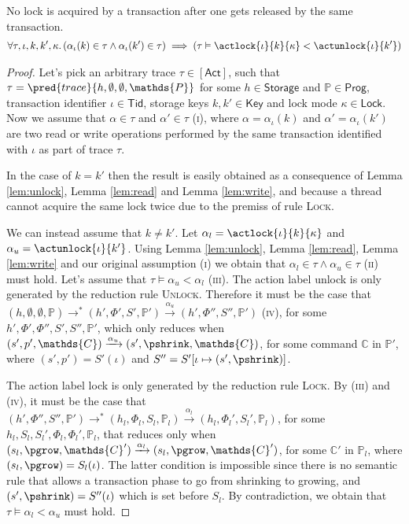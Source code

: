 \lem \label{lem:2phase} No lock is acquired by a transaction after one gets released by the same transaction.
\begin{gather*}
\forall \tau, \iota, k, k', \kappa \ldotp 
\left( \alpha_\iota(k) \in \tau \land \alpha_\iota(k') \in \tau \right)
\implies \left( \tau \vDash \actlock{\iota}{k}{\kappa} < \actunlock{\iota}{k'} \right)
\end{gather*}

\begin{proof}
Let's pick an arbitrary trace $\tau \in \mathsf{[Act]}$, such that $\tau = \pred{trace}{h, \emptyset, \emptyset, \mathds{P}}$ for some $h \in \mathsf{Storage}$ and $\mathds{P} \in \mathsf{Prog}$, transaction identifier $\iota \in \mathsf{Tid}$, storage keys $k, k' \in \mathsf{Key}$ and lock mode $\kappa \in \mathsf{Lock}$. Now we assume that  $\alpha \in \tau$ and $\alpha' \in \tau$ (\textsc{i}), where $\alpha = \alpha_\iota(k)$ and $\alpha' = \alpha_\iota(k')$ are two read or write operations performed by the same transaction identified with $\iota$ as part of trace $\tau$.

In the case of $k = k'$ then the result is easily obtained as a consequence of Lemma \ref{lem:unlock}, Lemma \ref{lem:read} and Lemma \ref{lem:write}, and because a thread cannot acquire the same lock twice due to the premiss of rule \textsc{Lock}.

We can instead assume that $k \neq k'$. Let $\alpha_l = \actlock{\iota}{k}{\kappa}$ and $\alpha_u = \actunlock{\iota}{k'}$. Using Lemma \ref{lem:unlock}, Lemma \ref{lem:read}, Lemma \ref{lem:write} and our original assumption (\textsc{i}) we obtain that $\alpha_l \in \tau \land \alpha_u \in \tau$ (\textsc{ii}) must hold. Let's assume that $\tau \vDash \alpha_u < \alpha_l$ (\textsc{iii}). The action label \textsf{unlock} is only generated by the reduction rule \textsc{Unlock}. Therefore it must be the case that $(h, \emptyset, \emptyset, \mathds{P}) \rightarrow^* (h', \Phi', S', \mathds{P}') \xrightarrow{\alpha_u} (h', \Phi'', S'', \mathds{P}')$ (\textsc{iv}), for some $h', \Phi', \Phi'', S', S'', \mathds{P}'$, which only reduces when $(s', p', \mathds{C}) \xrightarrow{\alpha_u} (s', \pshrink, \mathds{C})$, for some command $\mathds{C}$ in $\mathds{P}'$, where $(s', p') = S'(\iota)$ and $S'' = S'[\iota \mapsto (s', \pshrink)]$.

The action label \textsf{lock} is only generated by the reduction rule \textsc{Lock}. By (\textsc{iii}) and (\textsc{iv}), it must be the case that $(h', \Phi'', S'', \mathds{P}') \rightarrow^* (h_l, \Phi_l, S_l, \mathds{P}_l) \xrightarrow{\alpha_l} (h_l, \Phi_l', S_l', \mathds{P}_l)$, for some $h_l, S_l, S_l', \Phi_l, \Phi_l', \mathds{P}_l$, that reduces only when $(s_l, \pgrow, \mathds{C}') \xrightarrow{\alpha_l} (s_l, \pgrow, \mathds{C}')$, for some $\mathds{C}'$ in $\mathds{P}_l$, where $(s_l, \pgrow) = S_l(\iota)$. The latter condition is impossible since there is no semantic rule that allows a transaction phase to go from shrinking to growing, and $(s', \pshrink) = S''(\iota)$ which is set before $S_l$. By contradiction, we obtain that $\tau \vDash \alpha_l < \alpha_u$ must hold.
\end{proof}

